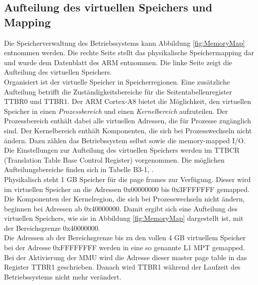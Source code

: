 


\subsection{Aufteilung des virtuellen Speichers und Mapping}
\label{subsect:memoryMapping}

Die Speicherverwaltung des Betriebssystems kann Abbildung \ref{fig:MemoryMap} entnommen werden. Die rechte Seite stellt das physikalische Speichermapping dar und wurde dem Datenblatt des ARM \cite[S. 155]{ARM:TRM} entnommen. Die linke Seite zeigt die Aufteilung des virtuellen Speichers.\\

Organisiert ist der virtuelle Speicher in Speicherregionen. Eine zusätzliche Aufteilung betrifft die Zuständigkeitsbereiche für die Seitentabellenregister TTBR0 und TTBR1. Der ARM Cortex-A8 bietet die Möglichkeit, den virtuellen Speicher in einen \emph{Prozessbereich} und einen \emph{Kernelbereich} aufzuteilen. Der Prozessbereich enthält dabei alle virtuellen Adressen, die für Prozesse zugänglich sind. Der Kernelbereich enthält Komponenten, die sich bei Prozesswechseln nicht ändern. Dazu zählen das Betriebssystem selbst sowie die memory-mapped I/O. \\ 

Die Einstellungen zur Aufteilung des virtuellen Speichers werden im  TTBCR (Translation Table Base Control Register) vorgenommen. Die möglichen Aufteilungsbereiche finden sich in Tabelle B3-1, \cite[S. B3-1330]{ARM:ARM}.\\

Physikalisch steht 1 GB Speicher für die page frames zur Verfügung. Dieser wird im virtuellen Speicher an die Adressen 0x00000000 bis 0x3FFFFFFF gemapped. Die Komponenten der Kernelregion, die sich bei Prozesswechseln nicht ändern, beginnen bei Adressen ab 0x40000000. Damit ergibt sich eine Aufteilung des virtuellen Speichers, wie sie in Abbildung \ref{fig:MemoryMap} dargestellt ist, mit der Bereichsgrenze 0x40000000.\\

Die Adressen ab der Bereichsgrenze bis zu den vollen 4 GB virtuellem Speicher bei der Adresse 0xFFFFFFFF werden in eine so genannte L1 \ac{MPT} gemapped. Bei der Aktivierung der MMU wird die Adresse dieser master page table in das Register TTBR1 geschrieben. Danach wird TTBR1 während der Laufzeit des Betriebssystems nicht mehr verändert.\\

